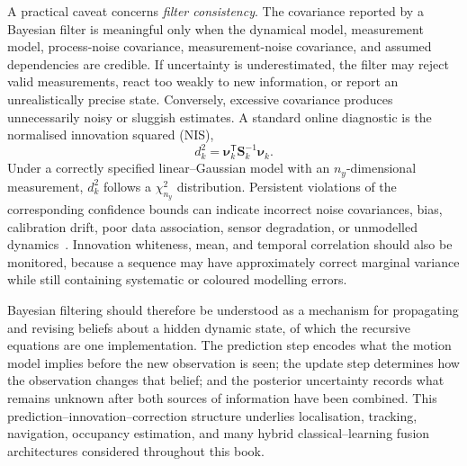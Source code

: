 
A practical caveat concerns \emph{filter consistency}. The covariance
reported by a Bayesian filter is meaningful only when the dynamical
model, measurement model, process-noise covariance, measurement-noise
covariance, and assumed dependencies are credible. If uncertainty is
underestimated, the filter may reject valid measurements, react too
weakly to new information, or report an unrealistically precise state.
Conversely, excessive covariance produces unnecessarily noisy or
sluggish estimates. A standard online diagnostic is the normalised
innovation squared (NIS),
\begin{equation}
d^2_k
=
\boldsymbol{\nu}_k^{\mathsf T}
\mathbf{S}_k^{-1}
\boldsymbol{\nu}_k.
\label{eq:nis}
\end{equation}
Under a correctly specified linear--Gaussian model with an
$n_y$-dimensional measurement, $d^2_k$ follows a
$\chi^2_{n_y}$ distribution. Persistent violations of the corresponding
confidence bounds can indicate incorrect noise covariances, bias,
calibration drift, poor data association, sensor degradation, or
unmodelled dynamics~\cite{barshalom2001_estimation}. Innovation
whiteness, mean, and temporal correlation should also be monitored,
because a sequence may have approximately correct marginal variance
while still containing systematic or coloured modelling errors.

Bayesian filtering should therefore be understood as a mechanism for propagating and revising beliefs about a hidden dynamic state, of which the recursive equations are one implementation. The prediction step encodes what the motion model implies before the new observation is seen; the update step determines how the observation changes that belief; and the posterior uncertainty records what remains unknown after both sources of information have been combined. This prediction--innovation--correction structure underlies localisation, tracking, navigation, occupancy estimation, and many hybrid classical--learning fusion architectures considered throughout this book.

